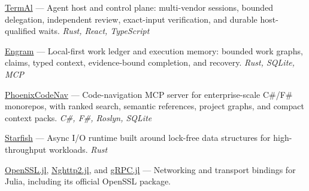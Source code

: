 
{
\fontsize{9pt}{1em}\bodyfont\upshape\color{text}
\vspace{1.5mm}
\begin{cvitems}

\item
{
  \href{https://grlap.github.io/TermAl/}{TermAl} --- Agent host and control plane: multi-vendor sessions, bounded delegation, independent review, exact-input verification, and durable host-qualified waits. \textit{Rust, React, TypeScript}
}

\item
{
  \href{https://grlap.github.io/Engram/}{Engram} --- Local-first work ledger and execution memory: bounded work graphs, claims, typed context, evidence-bound completion, and recovery. \textit{Rust, SQLite, MCP}
}

\item
{
  \href{https://grlap.github.io/PhoenixCodeNav/}{PhoenixCodeNav} --- Code-navigation MCP server for enterprise-scale C\#/F\# monorepos, with ranked search, semantic references, project graphs, and compact context packs. \textit{C\#, F\#, Roslyn, SQLite}
}

\item
{
  \href{https://github.com/grlap/starfish}{Starfish} --- Async I/O runtime built around lock-free data structures for high-throughput workloads. \textit{Rust}
}

\item
{
  \href{https://github.com/JuliaWeb/OpenSSL.jl}{OpenSSL.jl}, \href{https://github.com/grlap/Nghttp2.jl}{Nghttp2.jl}, and \href{https://github.com/grlap/gRPC.jl}{gRPC.jl} --- Networking and transport bindings for Julia, including its official OpenSSL package.
}

\end{cvitems}
\vspace{0.5mm}
}
